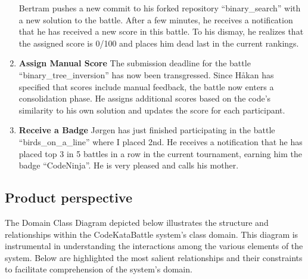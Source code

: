 \begin{enumerate}
    Bertram pushes a new commit to his forked repository “binary\_search” with a new solution to the battle. After a few minutes, he receives a notification that he has received a new score in this battle. To his dismay, he realizes that the assigned score is 0/100 and places him dead last in the current rankings. 
    \item {\textbf{Assign Manual Score}}\newline
    The submission deadline for the battle “binary\_tree\_inversion” has now been transgressed. 
Since Håkan has specified that scores include manual feedback, the battle now enters a consolidation phase. 
He assigns additional scores based on the code’s similarity to his own solution and updates the score for each participant. 
    \item {\textbf{Receive a Badge}}\newline
    Jørgen has just finished participating in the battle “birds\_on\_a\_line” where I placed 2nd. He receives a notification that he has placed top 3 in 5 battles in a row in the current tournament, earning him the badge “CodeNinja”. He is very pleased and calls his mother.  
\end{enumerate}

\subsection{Product perspective}

The Domain Class Diagram depicted below illustrates the structure and relationships within the CodeKataBattle system's class domain. This diagram is instrumental in understanding the interactions among the various elements of the system. Below are highlighted the most salient relationships and their constraints to facilitate comprehension of the system's domain.

